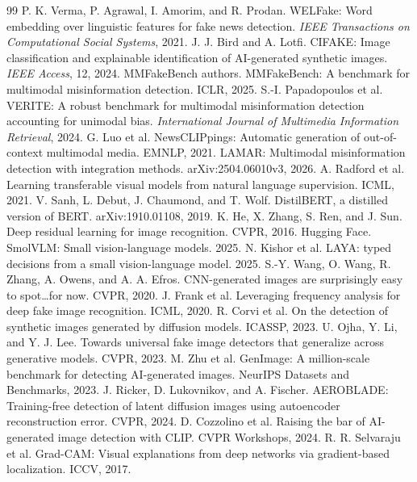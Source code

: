 \documentclass[11pt]{article}
\begin{document}
\begin{thebibliography}{99}
\small
{} P. K. Verma, P. Agrawal, I. Amorim, and R. Prodan. WELFake: Word embedding over linguistic features for fake news detection. \emph{IEEE Transactions on Computational Social Systems}, 2021.
 J. J. Bird and A. Lotfi. CIFAKE: Image classification and explainable identification of AI-generated synthetic images. \emph{IEEE Access}, 12, 2024.
 MMFakeBench authors. MMFakeBench: A benchmark for multimodal misinformation detection. ICLR, 2025.
 S.-I. Papadopoulos et al. VERITE: A robust benchmark for multimodal misinformation detection accounting for unimodal bias. \emph{International Journal of Multimedia Information Retrieval}, 2024.
 G. Luo et al. NewsCLIPpings: Automatic generation of out-of-context multimodal media. EMNLP, 2021.
 LAMAR: Multimodal misinformation detection with integration methods. arXiv:2504.06010v3, 2026.
 A. Radford et al. Learning transferable visual models from natural language supervision. ICML, 2021.
 V. Sanh, L. Debut, J. Chaumond, and T. Wolf. DistilBERT, a distilled version of BERT. arXiv:1910.01108, 2019.
 K. He, X. Zhang, S. Ren, and J. Sun. Deep residual learning for image recognition. CVPR, 2016.
 Hugging Face. SmolVLM: Small vision-language models. 2025.
 N. Kishor et al. LAYA: typed decisions from a small vision-language model. 2025.
 S.-Y. Wang, O. Wang, R. Zhang, A. Owens, and A. A. Efros. CNN-generated images are surprisingly easy to spot\ldots for now. CVPR, 2020.
 J. Frank et al. Leveraging frequency analysis for deep fake image recognition. ICML, 2020.
 R. Corvi et al. On the detection of synthetic images generated by diffusion models. ICASSP, 2023.
 U. Ojha, Y. Li, and Y. J. Lee. Towards universal fake image detectors that generalize across generative models. CVPR, 2023.
 M. Zhu et al. GenImage: A million-scale benchmark for detecting AI-generated images. NeurIPS Datasets and Benchmarks, 2023.
 J. Ricker, D. Lukovnikov, and A. Fischer. AEROBLADE: Training-free detection of latent diffusion images using autoencoder reconstruction error. CVPR, 2024.
 D. Cozzolino et al. Raising the bar of AI-generated image detection with CLIP. CVPR Workshops, 2024.
 R. R. Selvaraju et al. Grad-CAM: Visual explanations from deep networks via gradient-based localization. ICCV, 2017.
\end{thebibliography}
\end{document}
